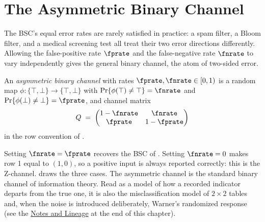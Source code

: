 %
%
%

\section{The Asymmetric Binary Channel}
\label{sec:asymmetric-channel}

The BSC's equal error rates are rarely satisfied in practice: a spam filter, a
Bloom filter, and a medical screening test all treat their two error directions
differently. Allowing the false-positive rate $\fprate$ and the false-negative
rate $\fnrate$ to vary independently gives the general binary channel,
the atom of two-sided error.

\begin{definition}
\label{def:asymmetric-channel}
An \emph{asymmetric binary channel} with rates $\fprate, \fnrate \in [0,1)$ is
a random map $\phi : \{\top, \bot\} \to \{\top, \bot\}$ with
$\Pr\{\phi(\top) \neq \top\} = \fnrate$ and $\Pr\{\phi(\bot) \neq \bot\} =
\fprate$, and channel matrix
\[
  Q \;=\;
  \begin{pmatrix}
    1 - \fnrate & \fnrate \\
    \fprate     & 1 - \fprate
  \end{pmatrix}
\]
in the row convention of .
\end{definition}

Setting $\fnrate = \fprate$ recovers the BSC of . Setting
$\fnrate = 0$ makes row 1 equal to $(1, 0)$, so a positive input is always
reported correctly: this is the Z-channel.  draws the
three cases. The asymmetric channel is the
standard binary channel of information theory. Read as a model of how a
recorded indicator departs from the true one, it is also the misclassification
model of $2 \times 2$ tables and, when the noise is introduced deliberately,
Warner's randomized response (see the
\hyperref[sec:bib-notes-ch2]{Notes and Lineage} at the end of this chapter).

